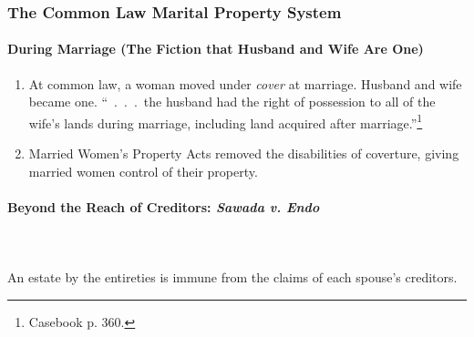 \subsubsection{The Common Law Marital Property System}

\paragraph{During Marriage (The Fiction that Husband and Wife Are One)}

\begin{enumerate}
    \item At common law, a woman moved under \emph{cover} at marriage. Husband 
    and wife became one. ``~.~.~.~the husband had the right of possession to 
    all of the wife's lands during marriage, including land acquired after 
    marriage.''\footnote{Casebook p. 360.}
    \item Married Women's Property Acts removed the disabilities of coverture, 
    giving married women control of their property.
\end{enumerate}

\paragraph{Beyond the Reach of Creditors: \emph{Sawada v. Endo}}
~\\\\
An estate by the entireties is immune from the claims of each spouse's 
creditors.

